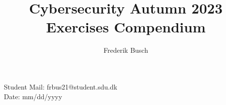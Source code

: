\documentclass{article}
\title{%
    \bf{Cybersecurity Autumn 2023} \\
    \large Exercises Compendium
}
\author{Frederik Busch}
\begin{document}
\maketitle
\vspace{\fill}
\begin{center}
    \bf{%

        Student Mail: frbus21@student.sdu.dk\\

        Date: mm/dd/yyyy}
\end{center}
\newpage
\setcounter{tocdepth}{2}
\tableofcontents
\newpage










\end{document}
